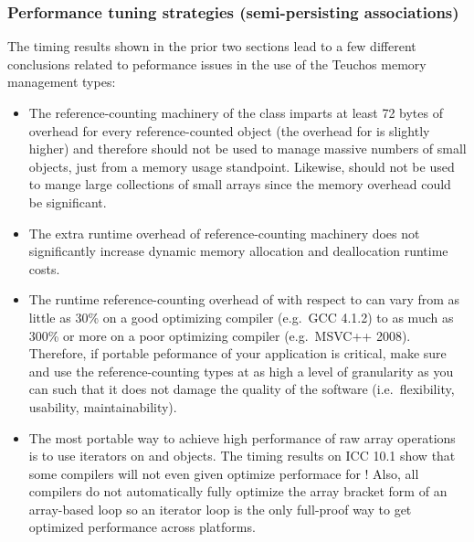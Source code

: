 \documentclass[pdf,ps2pdf,11pt]{SANDreport}
\begin{document}
%
{}\subsubsection{Performance tuning strategies (semi-persisting
associations)}
\label{sec:perf-tuning-strategies}
%

The timing results shown in the prior two sections lead to a few
different conclusions related to peformance issues in the use of the
Teuchos memory management types:

\begin{itemize}

{}\item The reference-counting machinery of the {} class
imparts at least 72 bytes of overhead for every reference-counted
object (the overhead for {} is slightly higher) and
therefore {} should not be used to manage massive numbers
of small objects, just from a memory usage standpoint.  Likewise,
{} should not be used to mange large collections of
small arrays since the memory overhead could be significant.

{}\item The extra runtime overhead of reference-counting machinery
does not significantly increase dynamic memory allocation and
deallocation runtime costs.

{}\item The runtime reference-counting overhead of {} with
respect to {} can vary from as little as
30\% on a good optimizing compiler (e.g.\ GCC 4.1.2) to as much as
300\% or more on a poor optimizing compiler (e.g.\ MSVC++ 2008).
Therefore, if portable peformance of your application is critical,
make sure and use the reference-counting types at as high a level of
granularity as you can such that it does not damage the quality of the
software (i.e.\ flexibility, usability, maintainability).

{}\item The most portable way to achieve high performance of raw array
operations is to use iterators on {} and
{} objects.  The timing results on ICC 10.1 show
that some compilers will not even given optimize performace for
{}!  Also, all compilers do not
automatically fully optimize the array bracket form of an array-based
loop so an iterator loop is the only full-proof way to get optimized
performance across platforms.

\end{itemize}
\end{document}

